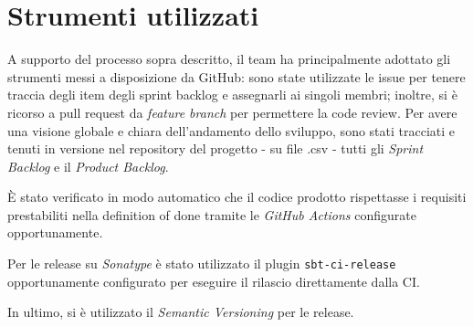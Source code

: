 \section{Strumenti utilizzati}\label{sec:strumenti-utilizzati}
A supporto del processo sopra descritto, il team ha principalmente adottato gli strumenti messi a disposizione da
GitHub: sono state utilizzate le issue per tenere traccia degli item degli sprint backlog e assegnarli ai singoli
membri;
inoltre, si è ricorso a pull request da \textit{feature branch} per permettere la code review.
Per avere una visione globale e chiara dell'andamento dello sviluppo, sono stati tracciati e tenuti in versione nel
repository del progetto - su file .csv - tutti gli \textit{Sprint Backlog} e il \textit{Product Backlog}.

È stato verificato in modo automatico che il codice prodotto rispettasse i requisiti prestabiliti nella
definition of done tramite le \textit{GitHub Actions} configurate opportunamente.

Per le release su \textit{Sonatype} è stato utilizzato il plugin \texttt{sbt-ci-release}\cite{sbt-ci-release}
opportunamente configurato per eseguire il rilascio direttamente dalla CI\@.

In ultimo, si è utilizzato il \textit{Semantic Versioning} per le release.
